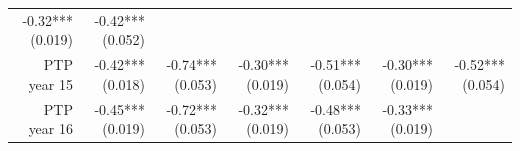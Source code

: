 \documentclass[]{article}
\begin{document}
\begin{longtable}[c]{@{}rrrrrrr@{}}
\begin{minipage}[t]{0.11\columnwidth}
-0.32*** (0.019)
\strut\end{minipage} &
\begin{minipage}[t]{0.11\columnwidth}\raggedleft\strut
-0.42*** (0.052)
\strut\end{minipage}\tabularnewline
\begin{minipage}[t]{0.12\columnwidth}\raggedleft\strut
PTP year 15
\strut\end{minipage} &
\begin{minipage}[t]{0.11\columnwidth}\raggedleft\strut
-0.42*** (0.018)
\strut\end{minipage} &
\begin{minipage}[t]{0.12\columnwidth}\raggedleft\strut
-0.74*** (0.053)
\strut\end{minipage} &
\begin{minipage}[t]{0.11\columnwidth}\raggedleft\strut
-0.30*** (0.019)
\strut\end{minipage} &
\begin{minipage}[t]{0.12\columnwidth}\raggedleft\strut
-0.51*** (0.054)
\strut\end{minipage} &
\begin{minipage}[t]{0.11\columnwidth}\raggedleft\strut
-0.30*** (0.019)
\strut\end{minipage} &
\begin{minipage}[t]{0.11\columnwidth}\raggedleft\strut
-0.52*** (0.054)
\strut\end{minipage}\tabularnewline
\begin{minipage}[t]{0.12\columnwidth}\raggedleft\strut
PTP year 16
\strut\end{minipage} &
\begin{minipage}[t]{0.11\columnwidth}\raggedleft\strut
-0.45*** (0.019)
\strut\end{minipage} &
\begin{minipage}[t]{0.12\columnwidth}\raggedleft\strut
-0.72*** (0.053)
\strut\end{minipage} &
\begin{minipage}[t]{0.11\columnwidth}\raggedleft\strut
-0.32*** (0.019)
\strut\end{minipage} &
\begin{minipage}[t]{0.12\columnwidth}\raggedleft\strut
-0.48*** (0.053)
\strut\end{minipage} &
\begin{minipage}[t]{0.11\columnwidth}\raggedleft\strut
-0.33*** (0.019)
\strut\end{minipage} &
\begin{minipage}[t]{0.11\columnwidth}\raggedleft\strut

\end{minipage}
\end{longtable}
\end{document}
